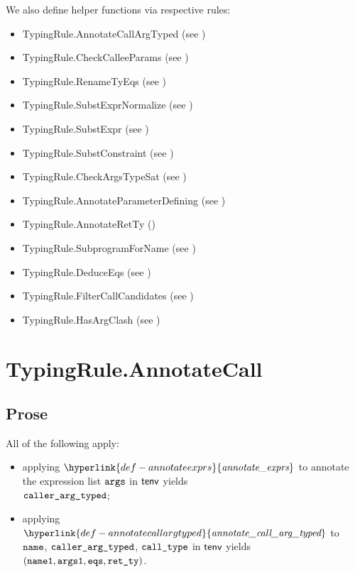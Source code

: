 \documentclass{book}
\newcommand\ProseOrTypeError[0]{\ProseTerminateAs{\TypeErrorConfig}}
\newcommand\annotateexprlist[0]{\hyperlink{def-annotateexprs}{\textfunc{annotate\_exprs}}}
\newcommand\annotatecallargtyped[0]{\hyperlink{def-annotatecallargtyped}{\textfunc{annotate\_call\_arg\_typed}}}
\begin{document}
We also define helper functions via respective rules:
\begin{itemize}
  \item TypingRule.AnnotateCallArgTyped (see )
  \item TypingRule.CheckCalleeParams (see )
  \item TypingRule.RenameTyEqs (see )
  \item TypingRule.SubstExprNormalize (see )
  \item TypingRule.SubstExpr (see )
  \item TypingRule.SubstConstraint (see )
  \item TypingRule.CheckArgsTypeSat (see )
  \item TypingRule.AnnotateParameterDefining (see )
  \item TypingRule.AnnotateRetTy ()
  \item TypingRule.SubprogramForName (see )
  \item TypingRule.DeduceEqs (see )
  \item TypingRule.FilterCallCandidates (see )
  \item TypingRule.HasArgClash (see )
\end{itemize}

\section{TypingRule.AnnotateCall \label{sec:TypingRule.AnnotateCall}}
\subsection{Prose}
All of the following apply:
\begin{itemize}
  \item applying $\annotateexprlist$ to annotate the expression list $\texttt{args}$ in $\textsf{tenv}$ yields \\
        $\texttt{caller\_arg\_typed}$\ProseOrTypeError;
  \item applying $\annotatecallargtyped$ to $\texttt{name}$, $\texttt{caller\_arg\_typed}$, $\texttt{call\_type}$ in $\textsf{tenv}$ yields
        $(\texttt{name1}, \texttt{args1}, \texttt{eqs}, \texttt{ret\_ty})$\ProseOrTypeError.
\end{itemize}
\end{document}
